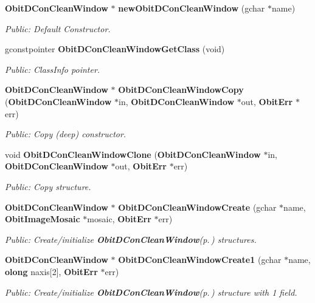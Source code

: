\begin{CompactItemize}
{\bf Obit\-DCon\-Clean\-Window} $\ast$ {\bf new\-Obit\-DCon\-Clean\-Window} (gchar $\ast$name)
\begin{CompactList}\small\item\em Public: Default Constructor. \item\end{CompactList}\item 
gconstpointer {\bf Obit\-DCon\-Clean\-Window\-Get\-Class} (void)
\begin{CompactList}\small\item\em Public: Class\-Info pointer. \item\end{CompactList}\item 
{\bf Obit\-DCon\-Clean\-Window} $\ast$ {\bf Obit\-DCon\-Clean\-Window\-Copy} ({\bf Obit\-DCon\-Clean\-Window} $\ast$in, {\bf Obit\-DCon\-Clean\-Window} $\ast$out, {\bf Obit\-Err} $\ast$err)
\begin{CompactList}\small\item\em Public: Copy (deep) constructor. \item\end{CompactList}\item 
void {\bf Obit\-DCon\-Clean\-Window\-Clone} ({\bf Obit\-DCon\-Clean\-Window} $\ast$in, {\bf Obit\-DCon\-Clean\-Window} $\ast$out, {\bf Obit\-Err} $\ast$err)
\begin{CompactList}\small\item\em Public: Copy structure. \item\end{CompactList}\item 
{\bf Obit\-DCon\-Clean\-Window} $\ast$ {\bf Obit\-DCon\-Clean\-Window\-Create} (gchar $\ast$name, {\bf Obit\-Image\-Mosaic} $\ast$mosaic, {\bf Obit\-Err} $\ast$err)
\begin{CompactList}\small\item\em Public: Create/initialize {\bf Obit\-DCon\-Clean\-Window}{\rm (p.\,\pageref{structObitDConCleanWindow})} structures. \item\end{CompactList}\item 
{\bf Obit\-DCon\-Clean\-Window} $\ast$ {\bf Obit\-DCon\-Clean\-Window\-Create1} (gchar $\ast$name, {\bf olong} naxis[2], {\bf Obit\-Err} $\ast$err)
\begin{CompactList}\small\item\em Public: Create/initialize {\bf Obit\-DCon\-Clean\-Window}{\rm (p.\,\pageref{structObitDConCleanWindow})} structure with 1 field. \item\end{CompactList}\item 

\end{CompactItemize}
